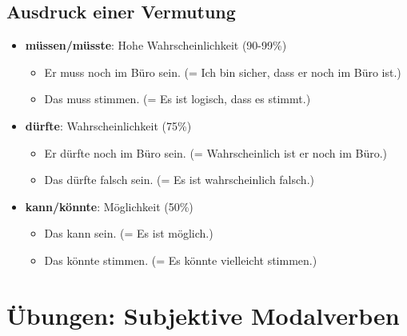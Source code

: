 \subsection{Ausdruck einer Vermutung}
\begin{itemize}
    \item \textbf{müssen/müsste}: Hohe Wahrscheinlichkeit (90-99\%)
        \begin{itemize}
            \item Er muss noch im Büro sein. (= Ich bin sicher, dass er noch im Büro ist.)
            \item Das muss stimmen. (= Es ist logisch, dass es stimmt.)
        \end{itemize}
    \item \textbf{dürfte}: Wahrscheinlichkeit (75\%)
        \begin{itemize}
            \item Er dürfte noch im Büro sein. (= Wahrscheinlich ist er noch im Büro.)
            \item Das dürfte falsch sein. (= Es ist wahrscheinlich falsch.)
        \end{itemize}
    \item \textbf{kann/könnte}: Möglichkeit (50\%)
        \begin{itemize}
            \item Das kann sein. (= Es ist möglich.)
            \item Das könnte stimmen. (= Es könnte vielleicht stimmen.)
        \end{itemize}
\end{itemize}

\section{Übungen: Subjektive Modalverben}
\label{sec:SubjektiveModalUebungen}

